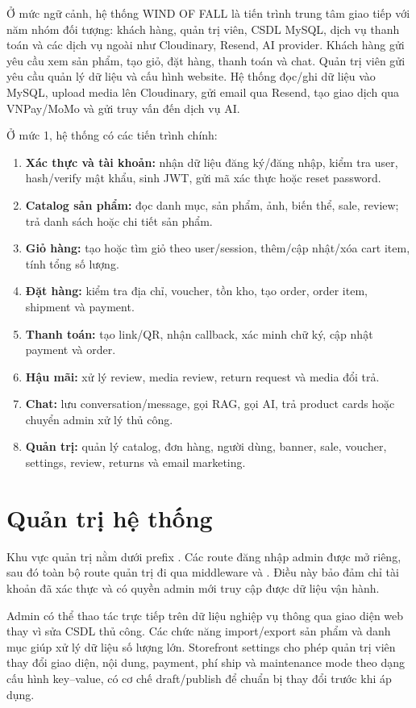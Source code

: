 \documentclass[12pt,a4paper]{report}
\begin{document}
Ở mức ngữ cảnh, hệ thống WIND OF FALL là tiến trình trung tâm giao tiếp với năm nhóm đối tượng: khách hàng, quản trị viên, CSDL MySQL, dịch vụ thanh toán và các dịch vụ ngoài như Cloudinary, Resend, AI provider. Khách hàng gửi yêu cầu xem sản phẩm, tạo giỏ, đặt hàng, thanh toán và chat. Quản trị viên gửi yêu cầu quản lý dữ liệu và cấu hình website. Hệ thống đọc/ghi dữ liệu vào MySQL, upload media lên Cloudinary, gửi email qua Resend, tạo giao dịch qua VNPay/MoMo và gửi truy vấn đến dịch vụ AI.

Ở mức 1, hệ thống có các tiến trình chính:

\begin{enumerate}
    \item \textbf{Xác thực và tài khoản:} nhận dữ liệu đăng ký/đăng nhập, kiểm tra user, hash/verify mật khẩu, sinh JWT, gửi mã xác thực hoặc reset password.
    \item \textbf{Catalog sản phẩm:} đọc danh mục, sản phẩm, ảnh, biến thể, sale, review; trả danh sách hoặc chi tiết sản phẩm.
    \item \textbf{Giỏ hàng:} tạo hoặc tìm giỏ theo user/session, thêm/cập nhật/xóa cart item, tính tổng số lượng.
    \item \textbf{Đặt hàng:} kiểm tra địa chỉ, voucher, tồn kho, tạo order, order item, shipment và payment.
    \item \textbf{Thanh toán:} tạo link/QR, nhận callback, xác minh chữ ký, cập nhật payment và order.
    \item \textbf{Hậu mãi:} xử lý review, media review, return request và media đổi trả.
    \item \textbf{Chat:} lưu conversation/message, gọi RAG, gọi AI, trả product cards hoặc chuyển admin xử lý thủ công.
    \item \textbf{Quản trị:} quản lý catalog, đơn hàng, người dùng, banner, sale, voucher, settings, review, returns và email marketing.
\end{enumerate}

\section{Quản trị hệ thống}

Khu vực quản trị nằm dưới prefix . Các route đăng nhập admin được mở riêng, sau đó toàn bộ route quản trị đi qua middleware  và . Điều này bảo đảm chỉ tài khoản đã xác thực và có quyền admin mới truy cập được dữ liệu vận hành.

Admin có thể thao tác trực tiếp trên dữ liệu nghiệp vụ thông qua giao diện web thay vì sửa CSDL thủ công. Các chức năng import/export sản phẩm và danh mục giúp xử lý dữ liệu số lượng lớn. Storefront settings cho phép quản trị viên thay đổi giao diện, nội dung, payment, phí ship và maintenance mode theo dạng cấu hình key--value, có cơ chế draft/publish để chuẩn bị thay đổi trước khi áp dụng.
\end{document}
